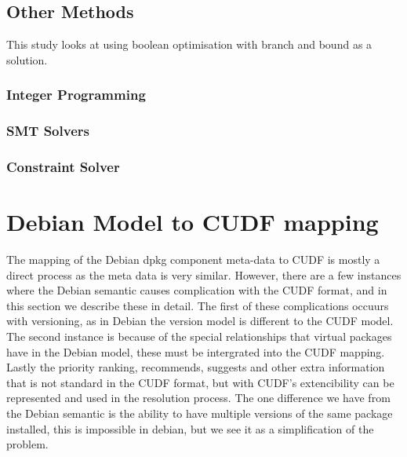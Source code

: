 
\subsection{Other Methods}
This \cite{Stuckenholz2007} study looks at using boolean optimisation with branch and bound as a solution.


\subsubsection{Integer Programming}
\subsubsection{SMT Solvers}
\subsubsection{Constraint Solver}


\section{Debian Model to CUDF mapping}
\label{DebToCUDF}
The mapping of the Debian dpkg component meta-data to CUDF is mostly a direct process as the meta data is very similar. 
However, there are a few instances where the Debian semantic causes complication with the CUDF format, and in this section we describe these in detail.
The first of these complications occuurs with versioning, as in Debian the version model is different to the CUDF model.
The second instance is because of the special relationships that virtual packages have in the Debian model, 
these must be intergrated into the CUDF mapping. 
Lastly the priority ranking, recommends, suggests and other extra information that is not standard in the CUDF format,
but with CUDF's extencibility can be represented and used in the resolution process.
The one difference we have from the Debian semantic is the ability to have multiple versions of the same package installed, this is impossible in debian, but we see it as a simplification of the problem.

